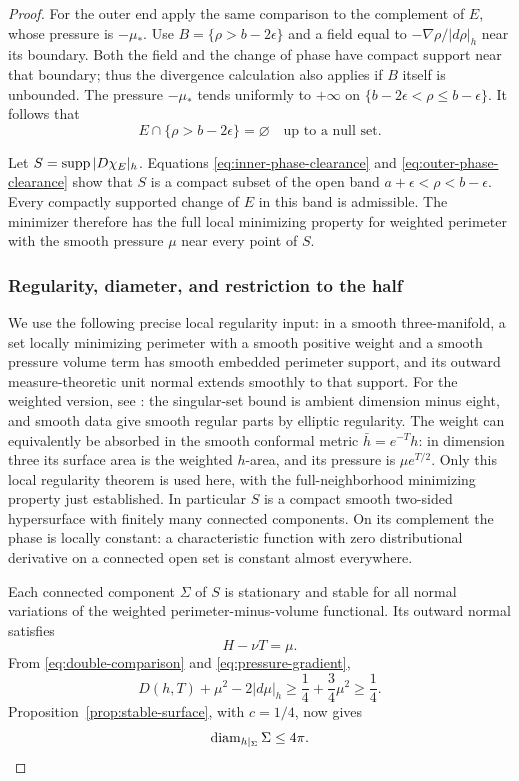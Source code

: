 \begin{proof}
For the outer end apply the same comparison to the complement of $E$,
whose pressure is $-\mu_*$.  Use
$B=\{\rho>b-2\epsilon\}$ and a field equal to
$-\nabla\rho/|d\rho|_h$ near its boundary.  Both the field and the
change of phase have compact support near that boundary; thus the
divergence calculation also applies if $B$ itself is unbounded.
The pressure $-\mu_*$ tends uniformly to $+\infty$ on
$\{b-2\epsilon<\rho\le b-\epsilon\}$.  It follows that
\begin{equation}\label{eq:outer-phase-clearance}
 E\cap\{\rho>b-2\epsilon\}=\varnothing
 \quad\text{up to a null set}.
\end{equation}

Let $S=\operatorname{supp}|D\chi_E|_h$.  Equations
\eqref{eq:inner-phase-clearance} and
\eqref{eq:outer-phase-clearance} show that $S$ is a compact subset of
the open band $a+\epsilon<\rho<b-\epsilon$.  Every compactly supported
change of $E$ in this band is admissible.  The minimizer therefore has
the full local minimizing property for weighted perimeter with the
smooth pressure $\mu$ near every point of $S$.

\subsubsection*{Regularity, diameter, and restriction to the half}
We use the following precise local regularity input: in a smooth
three-manifold, a set locally minimizing perimeter with a smooth
positive weight and a smooth pressure volume term has smooth embedded
perimeter support, and its outward measure-theoretic unit normal
extends smoothly to that support.  For the weighted version, see
\cite[Theorem~4.3 and Remarks~4.4]{Kemper2020}: the singular-set bound is
ambient dimension minus eight, and smooth data give smooth regular
parts by elliptic regularity.  The weight can equivalently be absorbed
in the smooth conformal metric $\bar h=e^{-T}h$: in dimension three its
surface area is the weighted $h$-area, and its pressure is
$\mu e^{T/2}$.  Only this local regularity theorem is used here, with
the full-neighborhood minimizing property just established.
In particular $S$ is a compact smooth two-sided hypersurface with
finitely many connected components.  On its complement the phase is
locally constant: a characteristic function with zero distributional
derivative on a connected open set is constant almost everywhere.

Each connected component $\Sigma$ of $S$ is stationary and stable for
all normal variations of the weighted perimeter-minus-volume
functional.  Its outward normal satisfies
\[
 H-\nu T=\mu.
\]
From \eqref{eq:double-comparison} and \eqref{eq:pressure-gradient},
\[
 D(h,T)+\mu^2-2|d\mu|_h
 \ge\frac14+\frac34\mu^2\ge\frac14.
\]
Proposition~\ref{prop:stable-surface}, with $c=1/4$, now gives
\begin{equation}\label{eq:closed-interface-diameter}
 \operatorname{diam}_{h|_\Sigma}\Sigma\le4\pi.
\end{equation}


\end{proof}
